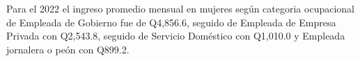 Para el 2022 el ingreso promedio mensual en mujeres según categoria ocupacional de Empleada de Gobierno fue de Q4,856.6, seguido de Empleada de Empresa Privada con Q2,543.8, seguido de Servicio Doméstico con Q1,010.0 y Empleada jornalera o peón con Q899.2.